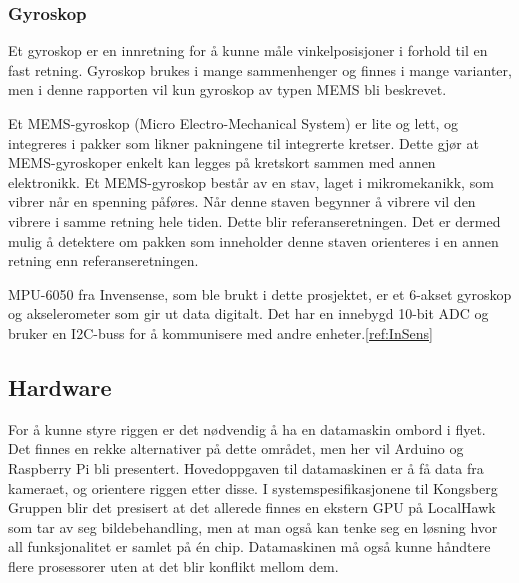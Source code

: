 \subsubsection{Gyroskop}

Et gyroskop er en innretning for å kunne måle vinkelposisjoner i forhold til en fast retning. Gyroskop brukes i mange sammenhenger og finnes i mange varianter, men i denne rapporten vil kun gyroskop av typen MEMS bli beskrevet. 

Et MEMS-gyroskop (Micro Electro-Mechanical System) er lite og lett, og integreres i pakker som likner pakningene til integrerte kretser. Dette gjør at MEMS-gyroskoper enkelt kan legges på kretskort sammen med annen elektronikk. Et MEMS-gyroskop består av en stav, laget i mikromekanikk, som vibrer når en spenning påføres. Når denne staven begynner å vibrere vil den vibrere i samme retning hele tiden. Dette blir referanseretningen. Det er dermed mulig å detektere om pakken som inneholder denne staven orienteres i en annen retning enn referanseretningen.

MPU-6050 fra Invensense, som ble brukt i dette prosjektet, er et 6-akset gyroskop og akselerometer som gir ut data digitalt. Det har en innebygd 10-bit ADC og bruker en I2C-buss for å kommunisere med andre enheter.\ref{ref:InSens}

\subsection{Hardware}
For å kunne styre riggen er det nødvendig å ha en datamaskin ombord i flyet. Det finnes en rekke alternativer på dette området, men her vil Arduino og Raspberry Pi bli presentert. Hovedoppgaven til datamaskinen er å få data fra kameraet, og orientere riggen etter disse. I systemspesifikasjonene til Kongsberg Gruppen blir det presisert at det allerede finnes en ekstern GPU på LocalHawk som tar av seg bildebehandling, men at man også kan tenke seg en løsning hvor all funksjonalitet er samlet på én chip. Datamaskinen må også kunne håndtere flere prosessorer uten at det blir konflikt mellom dem.

